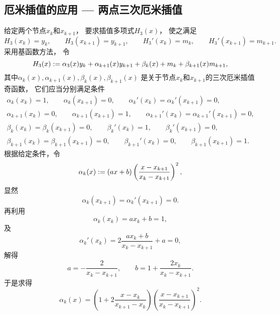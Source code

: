 \subsection{厄米插值的应用 --- 两点三次厄米插值}
给定两个节点\(x_k\)和\(x_{k+1}\)，
要求插值多项式\(H_3(x)\)，
使之满足\begin{equation*}
	H_3(x_k) = y_k,
	\qquad
	H_3(x_{k+1}) = y_{k+1},
	\qquad
	H_3'(x_k) = m_k,
	\qquad
	H_3'(x_{k+1}) = m_{k+1}.
\end{equation*}
采用基函数方法，
令\begin{equation*}
	H_3(x)
	:=
	\alpha_3(x) y_k
	+ \alpha_{k+1}(x) y_{k+1}
	+ \beta_k(x) + m_k
	+ \beta_{k+1}(x) m_{k+1},
\end{equation*}
其中\(\alpha_k(x),\alpha_{k+1}(x),\beta_k(x),\beta_{k+1}(x)\)
是关于节点\(x_k\)和\(x_{k+1}\)的三次厄米插值奇函数，
它们应当分别满足条件\begin{gather*}
	\alpha_k(x_k) = 1,
	\qquad
	\alpha_k(x_{k+1}) = 0,
	\qquad
	\alpha_k'(x_k)
	= \alpha_k'(x_{k+1})
	= 0, \\
	\alpha_{k+1}(x_k) = 0,
	\qquad
	\alpha_{k+1}(x_{k+1}) = 1,
	\qquad
	\alpha_{k+1}'(x_k)
	= \alpha_{k+1}'(x_{k+1})
	= 0, \\
	\beta_k(x_k)
	= \beta_k(x_{k+1})
	= 0,
	\qquad
	\beta_k'(x_k) = 1,
	\qquad
	\beta_k'(x_{k+1}) = 0, \\
	\beta_{k+1}(x_k)
	= \beta_{k+1}(x_{k+1})
	= 0,
	\qquad
	\beta_{k+1}'(x_k) = 0,
	\qquad
	\beta_{k+1}(x_{k+1}) = 1.
\end{gather*}
根据给定条件，令\begin{equation*}
	\alpha_k(x)
	:=
	(a x + b)
	\left( \frac{x - x_{k+1}}{x_k - x_{k+1}} \right)^2,
\end{equation*}
显然\begin{equation*}
	\alpha_k(x_{k+1})
	= \alpha_k'(x_{k+1})
	= 0.
\end{equation*}
再利用\begin{equation*}
	\alpha_k(x_k)
	= a x_k + b
	= 1,
\end{equation*}
及\begin{equation*}
	\alpha_k'(x_k)
	= 2 \frac{a x_k + b}{x_k - x_{k+1}} + a
	= 0,
\end{equation*}
解得\begin{equation*}
	a = - \frac{2}{x_k - x_{k+1}},
	\qquad
	b = 1 + \frac{2 x_k}{x_k - x_{k+1}}.
\end{equation*}
于是求得\begin{equation}\label{equation:厄米插值.厄米插值基函数1}
	\alpha_k(x)
	= \left( 1 + 2 \frac{x - x_k}{x_{k+1} - x_k} \right)
	\left( \frac{x - x_{k+1}}{x_k - x_{k+1}} \right)^2.
\end{equation}
